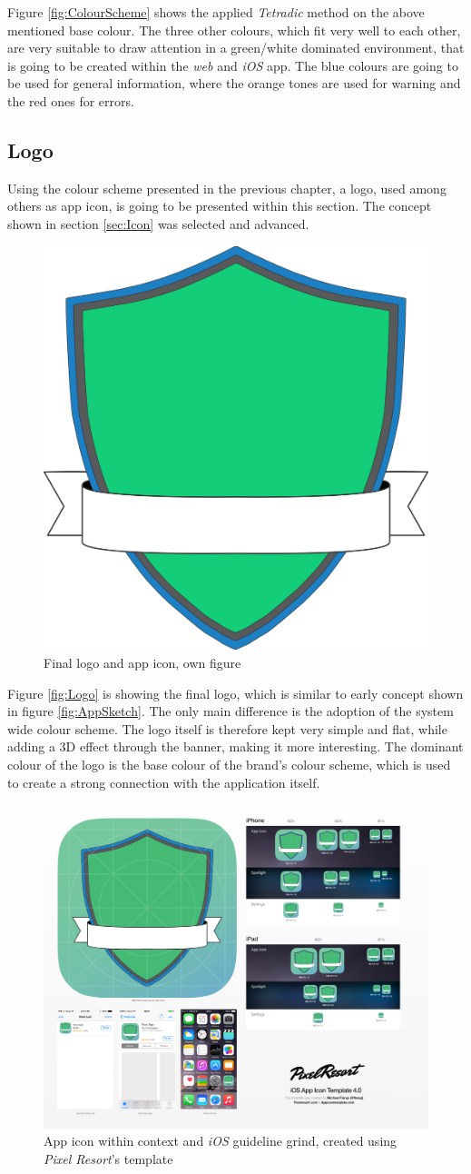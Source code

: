 Figure \vref{fig:ColourScheme} shows the applied \emph{Tetradic} method on the above mentioned base colour. The three other colours, which fit very well to each other, are very suitable to draw attention in a green/white dominated environment, that is going to be created within the \emph{web} and \emph{iOS} app. The blue colours are going to be used for general information, where the orange tones are used for warning and the red ones for errors.

\subsection{Logo}
Using the colour scheme presented in the previous chapter, a logo, used among others as app icon, is going to be presented within this section. The concept shown in section \vref{sec:Icon} was selected and advanced. 

\begin{figure}[h]
  	\centering
  	\includegraphics[width=0.45\linewidth]{./images/logo-final.png}
  	\caption{Final logo and app icon, own figure}
	\label{fig:Logo}
\end{figure}

Figure \vref{fig:Logo} is showing the final logo, which is similar to early concept shown in figure \vref{fig:AppSketch}. The only main difference is the adoption of the system wide colour scheme. The logo itself is therefore kept very simple and flat, while adding a 3D effect through the banner, making it more interesting. The dominant colour of the logo is the base colour of the brand's colour scheme, which is used to create a strong connection with the application itself.

\begin{figure}[h]
  	\centering
  	\includegraphics[width=0.6\linewidth]{./images/icon-context.png}
  	\caption{App icon within context and \emph{iOS} guideline grind, created using \emph{Pixel Resort}'s template}
	\label{fig:IconFinal}
\end{figure}

